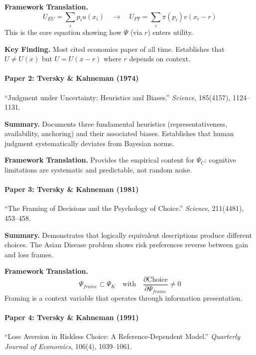\textbf{Framework Translation.}
\begin{equation}
U_{EU} = \sum_i p_i u(x_i) \quad \to \quad U_{PT} = \sum_i \pi(p_i) v(x_i - r)
\end{equation}
This is the core equation showing how $\Psi$ (via $r$) enters utility.

\textbf{Key Finding.}
Most cited economics paper of all time. Establishes that $U \neq U(x)$ but 
$U = U(x - r)$ where $r$ depends on context.

\paragraph{Paper 2: Tversky \& Kahneman (1974)}

``Judgment under Uncertainty: Heuristics and Biases.''
\textit{Science}, 185(4157), 1124--1131.

\textbf{Summary.}
Documents three fundamental heuristics (representativeness, availability, 
anchoring) and their associated biases. Establishes that human judgment 
systematically deviates from Bayesian norms.

\textbf{Framework Translation.}
Provides the empirical content for $\Psi_C$: cognitive limitations are 
systematic and predictable, not random noise.

\paragraph{Paper 3: Tversky \& Kahneman (1981)}

``The Framing of Decisions and the Psychology of Choice.''
\textit{Science}, 211(4481), 453--458.

\textbf{Summary.}
Demonstrates that logically equivalent descriptions produce different choices.
The Asian Disease problem shows risk preferences reverse between gain and loss frames.

\textbf{Framework Translation.}
\begin{equation}
\Psi_{frame} \subset \Psi_K \quad \text{with} \quad \frac{\partial \text{Choice}}{\partial \Psi_{frame}} \neq 0
\end{equation}
Framing is a context variable that operates through information presentation.

\paragraph{Paper 4: Tversky \& Kahneman (1991)}

``Loss Aversion in Riskless Choice: A Reference-Dependent Model.''
\textit{Quarterly Journal of Economics}, 106(4), 1039--1061.

